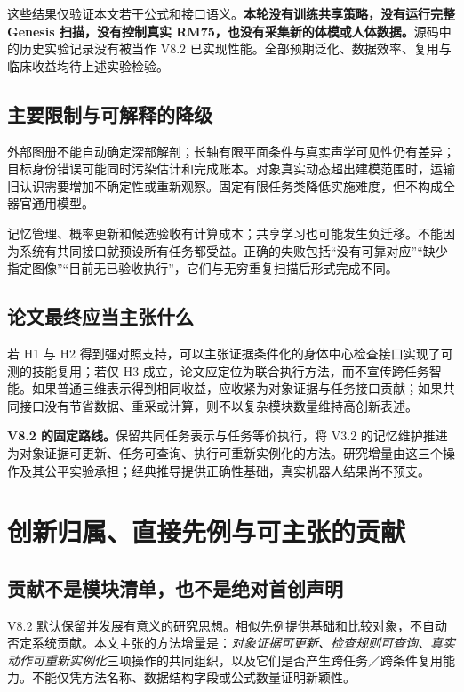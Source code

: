 \documentclass[UTF8,11pt,a4paper,fontset=fandol]{ctexart}
\numberwithin{equation}{section}
\theoremstyle{definition}
\begin{document}
这些结果仅验证本文若干公式和接口语义。\textbf{本轮没有训练共享策略，没有运行完整 Genesis 扫描，没有控制真实 RM75，也没有采集新的体模或人体数据。}源码中的历史实验记录没有被当作 V8.2 已实现性能。全部预期泛化、数据效率、复用与临床收益均待上述实验检验。

\subsection{主要限制与可解释的降级}
外部图册不能自动确定深部解剖；长轴有限平面条件与真实声学可见性仍有差异；目标身份错误可能同时污染估计和完成账本。对象真实动态超出建模范围时，运输旧认识需要增加不确定性或重新观察。固定有限任务类降低实施难度，但不构成全器官通用模型。

记忆管理、概率更新和候选验收有计算成本；共享学习也可能发生负迁移。不能因为系统有共同接口就预设所有任务都受益。正确的失败包括“没有可靠对应”“缺少指定图像”“目前无已验收执行”，它们与无穷重复扫描后形式完成不同。

\subsection{论文最终应当主张什么}
若 H1 与 H2 得到强对照支持，可以主张证据条件化的身体中心检查接口实现了可测的技能复用；若仅 H3 成立，论文应定位为联合执行方法，而不宣传跨任务智能。如果普通三维表示得到相同收益，应收紧为对象证据与任务接口贡献；如果共同接口没有节省数据、重采或计算，则不以复杂模块数量维持高创新表述。

\begin{keybox}
\textbf{V8.2 的固定路线。}保留共同任务表示与任务等价执行，将 V3.2 的记忆维护推进为对象证据可更新、任务可查询、执行可重新实例化的方法。研究增量由这三个操作及其公平实验承担；经典推导提供正确性基础，真实机器人结果尚不预支。
\end{keybox}

\clearpage
\appendix
\section{创新归属、直接先例与可主张的贡献}
\label{app:novelty}
\subsection{贡献不是模块清单，也不是绝对首创声明}
V8.2 默认保留并发展有意义的研究思想。相似先例提供基础和比较对象，不自动否定系统贡献。本文主张的方法增量是：\emph{对象证据可更新、检查规则可查询、真实动作可重新实例化}三项操作的共同组织，以及它们是否产生跨任务／跨条件复用能力。不能仅凭方法名称、数据结构字段或公式数量证明新颖性。
\end{document}
